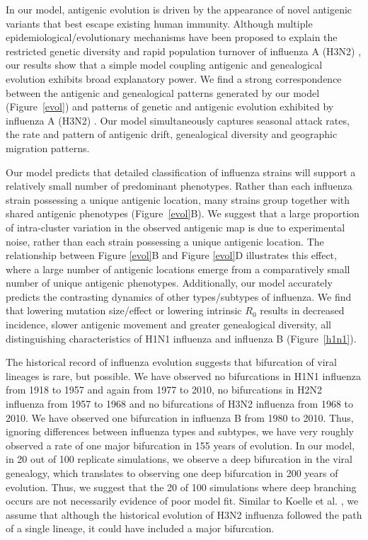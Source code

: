 \documentclass[11pt,oneside,letterpaper]{article}
\begin{document}
In our model, antigenic evolution is driven by the appearance of novel antigenic variants that best escape existing human immunity.  Although multiple epidemiological/evolutionary mechanisms have been proposed to explain the restricted genetic diversity and rapid population turnover of influenza A (H3N2) \cite{Ferguson03,Tria05,Koelle06,Recker07}, our results show that a simple model coupling antigenic and genealogical evolution exhibits broad explanatory power.  We find a strong correspondence between the antigenic and genealogical patterns generated by our model (Figure~\ref{evol}) and patterns of genetic and antigenic evolution exhibited by influenza A (H3N2) \cite{Fitch97,Smith04}.  Our model simultaneously captures seasonal attack rates, the rate and pattern of antigenic drift, genealogical diversity and geographic migration patterns.  

Our model predicts that detailed classification of influenza strains will support a relatively small number of predominant phenotypes.  Rather than each influenza strain possessing a unique antigenic location, many strains group together with shared antigenic phenotypes (Figure~\ref{evol}B).  We suggest that a large proportion of intra-cluster variation in the observed antigenic map is due to experimental noise, rather than each strain possessing a unique antigenic location.  The relationship between Figure \ref{evol}B and Figure \ref{evol}D illustrates this effect, where a large number of antigenic locations emerge from a comparatively small number of unique antigenic phenotypes.  Additionally, our model accurately predicts the contrasting dynamics of other types/subtypes of influenza.  We find that lowering mutation size/effect or lowering intrinsic $R_0$ results in decreased incidence, slower antigenic movement and greater genealogical diversity, all distinguishing characteristics of H1N1 influenza and influenza B (Figure~\ref{h1n1}).  

The historical record of influenza evolution suggests that bifurcation of viral lineages is rare, but possible.  We have observed no bifurcations in H1N1 influenza from 1918 to 1957 and again from 1977 to 2010, no bifurcations in H2N2 influenza from 1957 to 1968 and no bifurcations of H3N2 influenza from 1968 to 2010.  We have observed one bifurcation in influenza B from 1980 to 2010.  Thus, ignoring differences between influenza types and subtypes, we have very roughly observed a rate of one major bifurcation in 155 years of evolution.  In our model, in 20 out of 100 replicate simulations, we observe a deep bifurcation in the viral genealogy, which translates to observing one deep bifurcation in 200 years of evolution.  Thus, we suggest that the 20 of 100 simulations where deep branching occurs are not necessarily evidence of poor model fit. Similar to Koelle et al. \cite{Koelle11}, we assume that although the historical evolution of H3N2 influenza followed the path of a single lineage, it could have included a major bifurcation. 
\end{document}
